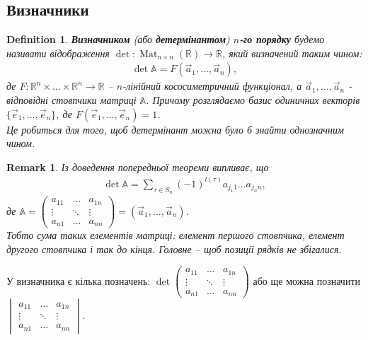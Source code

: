 \documentclass[a4paper, 10pt]{article}
\theoremstyle{theoremdd}
\newtheorem{definition}[theorem]{Definition}
\newtheorem{remark}[theorem]{Remark}
\DeclareMathOperator{\Mat}{Mat}
\begin{document}
\subsection{Визначники}
\begin{definition}
\textbf{Визначником} (або \textbf{детермінантом}) \textbf{$n$-го порядку} будемо називати відображення $\det \colon \Mat_{n \times n}(\mathbb{R}) \to \mathbb{R}$, який визначений таким чином:
\begin{align*}
\det \mathbb{A} = F(\vec{a}_1,\dots,\vec{a}_n),
\end{align*}
де $F \colon \mathbb{R}^n \times \dots \times \mathbb{R}^n \to \mathbb{R}$ -- $n$-лінійний кососиметричний функціонал, а $\vec{a}_1,\dots,\vec{a}_n$ - відповідні стовпчики матриці $\mathbb{A}$. Причому розглядаємо базис одиничних векторів $\{\vec{e}_1,\dots, \vec{e}_n\}$, де $F(\vec{e}_1,\dots,\vec{e}_n) = 1$.\\
\textit{Це робиться для того, щоб детермінант можна було б знайти однозначним чином.}
\end{definition}

\begin{remark}
Із доведення попередньої теореми випливає, що
\begin{align*}
\det \mathbb{A} = \displaystyle \sum_{\tau \in S_n} (-1)^{l(\tau)} a_{j_1 1}\dots a_{j_n n},
\end{align*}
де $\mathbb{A} = \begin{pmatrix}
 a_{11} & \dots & a_{1n} \\
 \vdots & \ddots &\vdots \\
 a_{n1} & \dots & a_{nn}
\end{pmatrix} = (\vec{a}_1, \dots, \vec{a}_n)$.\\
Тобто сума таких елементів матриці: елемент першого стовпчика, елемент другого стовпчика і так до кінця. Головне -- щоб позиції рядків не збігалися.
\end{remark}
\noindent
У визначника є кілька позначень: $\det \begin{pmatrix}
a_{11} & \dots & a_{1n} \\
 \vdots & \ddots &\vdots \\
 a_{n1} & \dots & a_{nn}
\end{pmatrix}$ або ще можна позначити $\begin{vmatrix}
a_{11} & \dots & a_{1n} \\
 \vdots & \ddots &\vdots \\
 a_{n1} & \dots & a_{nn}
\end{vmatrix}$.
\end{document}
